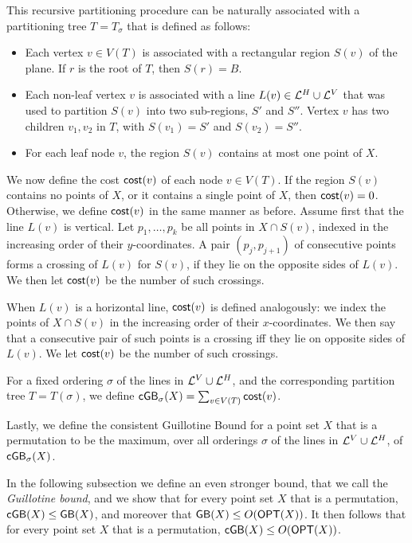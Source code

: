 \documentclass[11pt]{article}
\numberwithin{equation}{section}
\theoremstyle{definition}
\theoremstyle{plain}
\begin{document}
%
%

This recursive partitioning procedure can be naturally associated with a partitioning tree  $T=T_{\sigma}$ that is defined as follows: 

\begin{itemize}
\item Each vertex $v\in V(T)$ is associated with a rectangular region $S(v)$ of the plane. If $r$ is the root of $T$, then $S(r) =B$. 

\item Each non-leaf vertex $v$  is associated with a line $L(v)\in {\mathcal L}^H\cup {\mathcal L}^V$ that was used to partition $S(v)$ into two sub-regions, $S'$ and $S''$. Vertex $v$ has two children $v_1,v_2$ in $T$, with $S(v_1)=S'$ and $S(v_2)=S''$.

\item For each leaf node $v$, the region $S(v)$ contains at most one point of $X$.
\end{itemize}  




We now define the cost $\mathsf{cost}(v)$ of each node $v\in V(T)$. If the region $S(v)$ contains no points of $X$, or it contains a single point of $X$, then $\mathsf{cost}(v)=0$. Otherwise, we define $\mathsf{cost}(v)$ in the same manner as before. Assume first that the line $L(v)$ is vertical. Let $p_1, \ldots, p_k$  be all points in $X\cap S(v)$, indexed in the increasing order of their $y$-coordinates. A pair $(p_j, p_{j+1})$ of consecutive  points forms a crossing of $L(v)$ for $S(v)$, if they lie on the opposite sides of $L(v)$. We then let $\mathsf{cost}(v)$ be the number of such crossings. 

When $L(v)$ is a horizontal line, $\mathsf{cost}(v)$ is defined analogously: we index the points of $X\cap S(v)$ in the increasing order of their $x$-coordinates. We then say that a consecutive pair of such points is a crossing iff they lie on opposite sides of $L(v)$. We let $\mathsf{cost}(v)$ be the number of such crossings.

For a fixed ordering $\sigma$ of the lines in ${\mathcal L}^V\cup {\mathcal L}^H$, and the corresponding partition tree $T= T(\sigma)$, we define $\mathsf{cGB}_{\sigma}(X) = \sum_{v \in V(T)} \mathsf{cost}(v)$. 

Lastly, we define the consistent Guillotine Bound for a point set $X$ that is a permutation to be the maximum, over all orderings $\sigma$ of the lines in ${\mathcal L}^V\cup {\mathcal L}^H$, of $\mathsf{cGB}_{\sigma}(X)$.  


In the following subsection we define an even stronger bound, that we call the \emph{Guillotine bound}, and we show that for every point set $X$ that is a permutation, $\mathsf{cGB}(X)\leq \mathsf{GB}(X)$, and moreover that $\mathsf{GB}(X)\leq O(\mbox{\sf OPT}(X))$. It then follows that for every point set $X$ that is a permutation, $\mathsf{cGB}(X)\leq O(\mbox{\sf OPT}(X))$.
\end{document}
